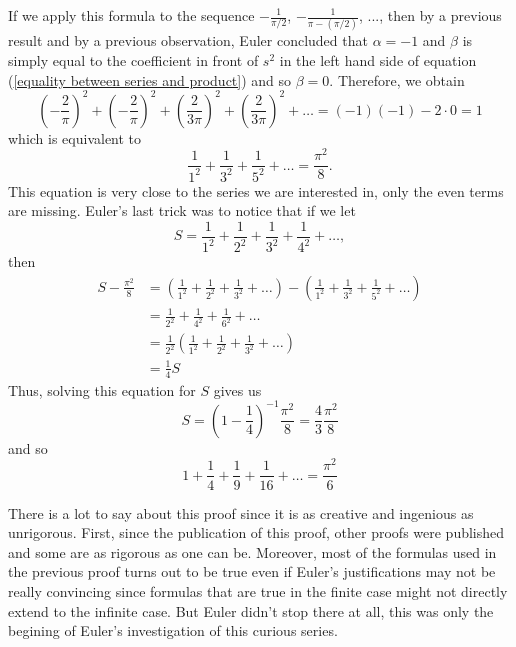 If we apply this formula to the sequence $-\frac{1}{\pi/2}$, $-\frac{1}{\pi - (\pi/2)}$, ..., then by a previous result and by a previous observation, Euler concluded that $\alpha = -1$ and $\beta$ is simply equal to the coefficient in front of $s^2$ in the left hand side of equation (\ref{equality between series and product}) and so $\beta = 0$. Therefore, we obtain
$$\left(-\frac{2}{\pi}\right)^2 + \left(-\frac{2}{\pi}\right)^2 + \left(\frac{2}{3\pi}\right)^2 + \left(\frac{2}{3\pi}\right)^2 + \dots = (-1)(-1) - 2\cdot 0 = 1$$
which is equivalent to
\begin{equation} \label{zeta-2 but only odd numbers}
    \frac{1}{1^2} + \frac{1}{3^2} + \frac{1}{5^2} + \dots = \frac{\pi^2}{8}.
\end{equation}
This equation is very close to the series we are interested in, only the even terms are missing. Euler's last trick was to notice that if we let
$$S = \frac{1}{1^2} + \frac{1}{2^2} + \frac{1}{3^2} + \frac{1}{4^2} + \dots,$$
then 
\begin{align*}
    S - \frac{\pi^2}{8} &= \left(\frac{1}{1^2} + \frac{1}{2^2} + \frac{1}{3^2} + \dots\right) - \left(\frac{1}{1^2} + \frac{1}{3^2} + \frac{1}{5^2} + \dots\right) \\
    &= \frac{1}{2^2} + \frac{1}{4^2} + \frac{1}{6^2} + \dots \\
    &= \frac{1}{2^2}\left(\frac{1}{1^2} + \frac{1}{2^2} + \frac{1}{3^2} + \dots\right) \\
    &= \frac{1}{4}S
\end{align*} 
Thus, solving this equation for $S$ gives us 
$$S = \left(1 - \frac{1}{4}\right)^{-1}\frac{\pi^2}{8} = \frac{4}{3}\frac{\pi^2}{8}$$
and so 
\begin{equation} \label{pi^2/6}
    \boxed{1 + \frac{1}{4} + \frac{1}{9} + \frac{1}{16} + \dots = \frac{\pi^2}{6}}
\end{equation}

There is a lot to say about this proof since it is as creative and ingenious as unrigorous. First, since the publication of this proof, other proofs were published and some are as rigorous as one can be. Moreover, most of the formulas used in the previous proof turns out to be true even if Euler's justifications may not be really convincing since formulas that are true in the finite case might not directly extend to the infinite case. But Euler didn't stop there at all, this was only the begining of Euler's investigation of this curious series. 

